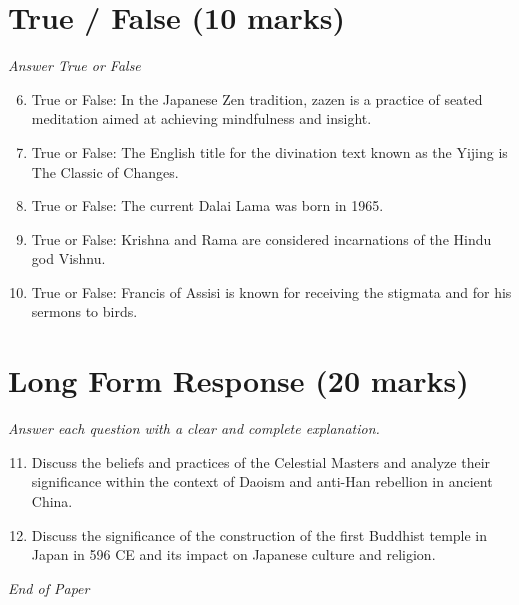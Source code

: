 \documentclass[12pt]{article}
\begin{document}
\section*{True / False (10 marks)}
\textit{Answer True or False}
\begin{enumerate}[label=\arabic*.]
\setcounter{enumi}{5}
\item True or False: In the Japanese Zen tradition, zazen is a practice of seated meditation aimed at achieving mindfulness and insight.
\item True or False: The English title for the divination text known as the Yijing is The Classic of Changes.
\item True or False: The current Dalai Lama was born in 1965.
\item True or False: Krishna and Rama are considered incarnations of the Hindu god Vishnu.
\item True or False: Francis of Assisi is known for receiving the stigmata and for his sermons to birds.
\end{enumerate}

\section*{Long Form Response (20 marks)}
\textit{Answer each question with a clear and complete explanation.}
\begin{enumerate}[label=\arabic*.]
\setcounter{enumi}{10}
\item Discuss the beliefs and practices of the Celestial Masters and analyze their significance within the context of Daoism and anti-Han rebellion in ancient China.
\item Discuss the significance of the construction of the first Buddhist temple in Japan in 596 CE and its impact on Japanese culture and religion.
\end{enumerate}

\vfill
\noindent\textit{End of Paper}
\end{document}
